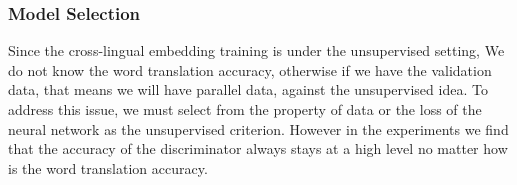 	
	\subsubsection{Model Selection}
	Since the cross-lingual embedding training is under the unsupervised setting, We do not know the word translation accuracy, otherwise if we have the validation data, that means we will have parallel data, against the unsupervised idea. To address this issue, we must select from the property of data or the loss of the neural network as the unsupervised criterion. However in the experiments we find that the accuracy of the discriminator always stays at a high level no matter how is the word translation accuracy. 
	
	